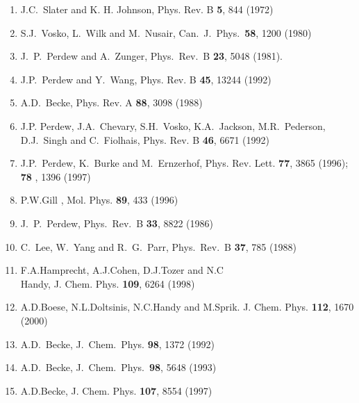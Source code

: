 {\footnotesize
\vspace{8.5cm}
\begin{enumerate}\setlength{\itemsep}{-1\baselineskip}
\setlength{\parsep}{-1\baselineskip}
\item J.C.~Slater and K. H. Johnson, Phys. Rev. B {\bf 5}, 844 (1972)\\
\item  S.J.~Vosko, L.~Wilk and M.~Nusair,
Can.~J.~Phys.~{\bf 58}, 1200 (1980)\\
\item  J.~P.~Perdew and A.~Zunger,  Phys.~Rev.~B {\bf23}, 5048
(1981). \\
\item  J.P.~Perdew and Y.~Wang, Phys. Rev. B {\bf 45},
13244 (1992)\\
\item   A.D.~Becke,  Phys. Rev. A {\bf 88}, 3098 (1988)\\ 
\item  J.P. Perdew,  J.A.~Chevary, S.H.~Vosko, K.A.~Jackson, 
M.R.~Pederson, D.J.~Singh and C.~Fiolhais, Phys. Rev. B {\bf 46}, 6671
(1992)\\
\item  J.P.~Perdew, K.~Burke and M.~Ernzerhof, 
Phys. Rev. Lett. {\bf 77}, 3865 (1996); {\bf 78 }, 1396 (1997)\\
\item  P.W.Gill , Mol. Phys. {\bf 89}, 433 (1996)\\
\item  J.~P.~Perdew, Phys.~Rev.~B   {\bf33}, 8822 (1986)\\
\item C.~Lee, W.~Yang and R.~G.~Parr, Phys.~Rev.~B {\bf 37}, 785
(1988)\\
\item  F.A.Hamprecht, A.J.Cohen, D.J.Tozer and N.C\\ Handy, 
    J. Chem. Phys. {\bf 109}, 6264 (1998)\\
\item   A.D.Boese, N.L.Doltsinis, N.C.Handy and
M.Sprik. J. Chem. Phys. {\bf 112}, 1670 (2000)\\
\item  A.D.~Becke, J.~Chem.~Phys. {\bf 98}, 1372 (1992)\\
\item  A.D.~Becke, J.~Chem.~Phys.~{\bf 98}, 5648 (1993)\\
\item A.D.Becke, J. Chem. Phys. {\bf 107}, 8554 (1997)\\

\end{enumerate}}

